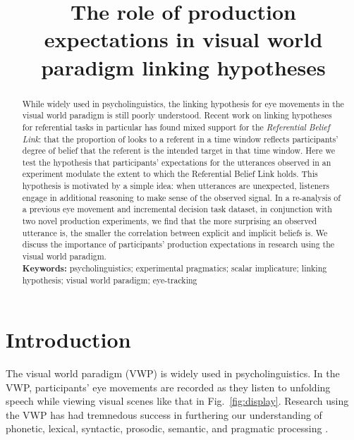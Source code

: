 \documentclass[10pt,letterpaper]{article}
\title{The role of production expectations in  visual world paradigm linking hypotheses}
\author{}
\newcommand{\figref}[1]{Fig.~\ref{#1}}
\begin{document}
\maketitle


\begin{abstract}

While widely used in psycholinguistics, the linking hypothesis for eye movements in the visual world paradigm is still poorly understood. Recent work on linking hypotheses for referential tasks in particular has found mixed support for the \emph{Referential Belief Link}: that the proportion of looks to a referent in a time window reflects participants' degree of belief that the referent is the intended target in that time window. Here we test the hypothesis that participants' expectations for the utterances observed in an experiment modulate the extent to which the Referential Belief Link holds. This hypothesis is motivated by a simple idea: when utterances are unexpected, listeners engage in additional reasoning to make sense of the observed signal. In a re-analysis of a previous eye movement and incremental decision task dataset, in conjunction with two novel production experiments, we find that the more surprising an observed utterance is, the smaller the correlation between explicit and implicit beliefs is. We discuss the importance of participants' production expectations in research using the visual world paradigm.\\
\textbf{Keywords:} psycholinguistics; experimental pragmatics; scalar implicature; linking hypothesis; visual world paradigm; eye-tracking

\end{abstract}

\section{Introduction}
The visual world paradigm (VWP) is widely used in psycholinguistics. In the VWP, participants' eye movements are recorded as they listen to unfolding speech while viewing visual scenes like that in \figref{fig:display}.  Research using the VWP has had tremnedous success in furthering our understanding of phonetic, lexical, syntactic, prosodic, semantic, and pragmatic processing  \cite{tanenhaus1995,Allopenna1998,altmann1999,clayards2008,SedivyEtAl1999:Achieving-Incremental-Semantic-,huang2009,kurumada2014}. %
\end{document}
